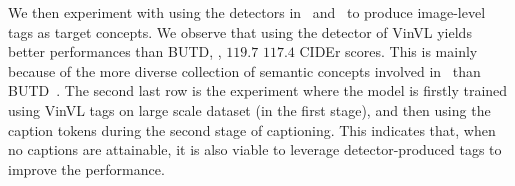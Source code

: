 We then experiment with using the detectors in~\citep{zhang2021multi} and~\citep{anderson2018bottom} to produce image-level tags as target concepts. We observe that using the detector of VinVL yields better performances than BUTD, \ie, $119.7$ \vs $117.4$ CIDEr scores. This is mainly because of the more diverse collection of semantic concepts involved in~\citep{zhang2021multi} than BUTD~\citep{anderson2018bottom}. 
The second last row is the experiment where the model is firstly trained using VinVL tags on large scale dataset (in the first stage), and then using the caption tokens during the second stage of captioning. This indicates that, when no captions are attainable, it is also viable to leverage detector-produced tags to improve the performance.


